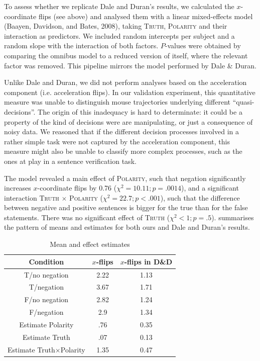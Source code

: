 \documentclass{article}
\begin{document}
To assess whether we replicate Dale and Duran's results, we calculated the $x$-coordinate flips (see above) and analysed them with a linear mixed-effects model (Baayen, Davidson, and Bates, 2008), taking \textsc{Truth}, \textsc{Polarity} and their interaction as predictors. We included random intercepts per subject and a random slope with the interaction of both factors. $P$-values were obtained by comparing the omnibus model to a reduced version of itself, where the relevant factor was removed. This pipeline mirrors the model performed by Dale \& Duran. 

Unlike Dale and Duran, we did not perform analyses based on the acceleration component (i.e. acceleration flips). 
In our validation experiment, this quantitative measure was unable to distinguish mouse trajectories underlying different ``quasi-decisions''.
The origin of this inadequacy is hard to determinate: it could be a property of the kind of decisions were are manipulating, or just a consequence of noisy data. We reasoned that if the different decision processes involved in a rather simple task were not captured by the acceleration component, this measure might also be unable to classify more complex processes, such as the ones at play in a sentence verification task. 

The model revealed a main effect of \textsc{Polarity}, such that negation significantly increases $x$-coordinate flips by 0.76 ($\chi^{2}=10.11; p=.0014$), and a significant interaction \textsc{Truth} $\times$ \textsc{Polarity} ($\chi^{2}=22.7; p<.001$), such that the difference between negative and positive sentences is bigger for the true than for the false statements. There was no significant effect of \textsc{Truth} ($\chi^{2}<1; p=.5$). 
 summarises the pattern of means and estimates for both ours and Dale and Duran's results. 

\begin{table}[h]
\begin{center}
\begin{tabular}{ccc}
Condition & $x$-flips &  $x$-flips in D\&D \\
\hline
T/no negation & 2.22 & 1.13 \\
T/negation & 3.67 & 1.71 \\
F/no negation & 2.82 & 1.24 \\
F/negation & 2.9 & 1.34 \\
Estimate Polarity & .76 & 0.35 \\
Estimate Truth & .07 & 0.13 \\
Estimate Truth$\times$Polarity & 1.35 & 0.47\\
\end{tabular}
\caption{Mean and effect estimates}
\label{table:negationresults}
\end{center}
\end{table}%
\end{document}
